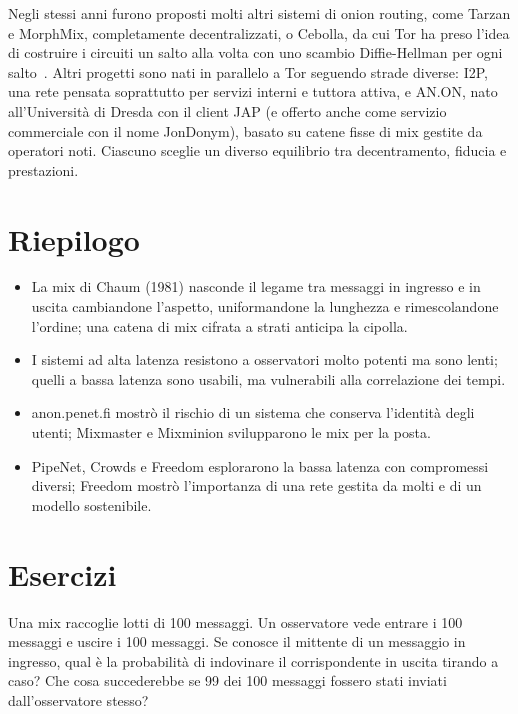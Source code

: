 \begin{approfondimento}
Negli stessi anni furono proposti molti altri sistemi di onion routing, come Tarzan e MorphMix, completamente decentralizzati, o Cebolla, da cui Tor ha preso l'idea di costruire i circuiti un salto alla volta con uno scambio Diffie-Hellman per ogni salto~\cite{syverson2011peel}. Altri progetti sono nati in parallelo a Tor seguendo strade diverse: I2P, una rete pensata soprattutto per servizi interni e tuttora attiva, e AN.ON, nato all'Università di Dresda con il client JAP (e offerto anche come servizio commerciale con il nome JonDonym), basato su catene fisse di mix gestite da operatori noti. Ciascuno sceglie un diverso equilibrio tra decentramento, fiducia e prestazioni.
\end{approfondimento}

\section*{Riepilogo}
\begin{itemize}
  \item La mix di Chaum (1981) nasconde il legame tra messaggi in ingresso e in uscita cambiandone l'aspetto, uniformandone la lunghezza e rimescolandone l'ordine; una catena di mix cifrata a strati anticipa la cipolla.
  \item I sistemi ad alta latenza resistono a osservatori molto potenti ma sono lenti; quelli a bassa latenza sono usabili, ma vulnerabili alla correlazione dei tempi.
  \item anon.penet.fi mostrò il rischio di un sistema che conserva l'identità degli utenti; Mixmaster e Mixminion svilupparono le mix per la posta.
  \item PipeNet, Crowds e Freedom esplorarono la bassa latenza con compromessi diversi; Freedom mostrò l'importanza di una rete gestita da molti e di un modello sostenibile.
\end{itemize}

\section*{Esercizi}

\begin{esercizio}[1]\label{es:02-mix}
Una mix raccoglie lotti di 100 messaggi. Un osservatore vede entrare i 100 messaggi e uscire i 100 messaggi. Se conosce il mittente di un messaggio in ingresso, qual è la probabilità di indovinare il corrispondente in uscita tirando a caso? Che cosa succederebbe se 99 dei 100 messaggi fossero stati inviati dall'osservatore stesso?
\end{esercizio}

